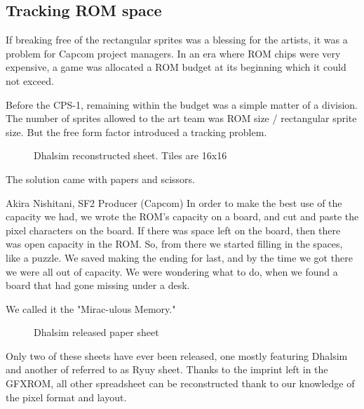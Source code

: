 







\subsection{Tracking ROM space}

If breaking free of the rectangular sprites was a blessing for the artists, it was a problem for Capcom project managers. In an era where ROM chips were very expensive, a game was allocated a ROM budget at its beginning which it could not exceed.


Before the CPS-1, remaining within the budget was a simple matter of a division. The number of sprites allowed to the art team was ROM size / rectangular sprite size. But the free form factor introduced a tracking problem.



 \begin{figure}[H]
\caption*{Dhalsim reconstructed sheet. Tiles are 16x16}
\end{figure}

The solution came with papers and scissors.

\begin{q}{Akira Nishitani, SF2 Producer (Capcom)}
In order to make the best use of the capacity we had, we wrote the ROM’s capacity on a board, and cut and paste the pixel characters on the board. If there was space left on the board, then there was open capacity in the ROM. So, from there we started filling in the spaces, like a puzzle. We saved making the ending for last, and by the time we got there we were all out of capacity. We were wondering what to do, when we found a board that had gone missing under a desk.

We called it the "Mirac-ulous Memory."
\end{q}



 \begin{figure}[H]
\caption*{Dhalsim released paper sheet}
\end{figure}

Only two of these sheets have ever been released, one mostly featuring Dhalsim\cite{ffdevinterview} and another of referred to as Ryuy sheet\cite{htmcc}. Thanks to the imprint left in the GFXROM, all other spreadsheet can be reconstructed thank to our knowledge of the pixel format and layout. 



